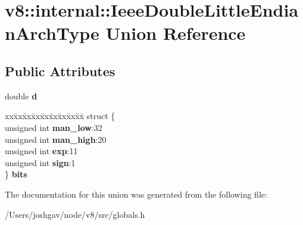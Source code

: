 \hypertarget{unionv8_1_1internal_1_1_ieee_double_little_endian_arch_type}{}\section{v8\+:\+:internal\+:\+:Ieee\+Double\+Little\+Endian\+Arch\+Type Union Reference}
\label{unionv8_1_1internal_1_1_ieee_double_little_endian_arch_type}
\subsection*{Public Attributes}
\begin{DoxyCompactItemize}
\item 
double {\bfseries d}\hypertarget{unionv8_1_1internal_1_1_ieee_double_little_endian_arch_type_aae1ea6412f669875160955735ed06f43}{}\label{unionv8_1_1internal_1_1_ieee_double_little_endian_arch_type_aae1ea6412f669875160955735ed06f43}

\item 
\begin{tabbing}
xx\=xx\=xx\=xx\=xx\=xx\=xx\=xx\=xx\=\kill
struct \{\\
\>unsigned int {\bfseries man\_low}:32\\
\>unsigned int {\bfseries man\_high}:20\\
\>unsigned int {\bfseries exp}:11\\
\>unsigned int {\bfseries sign}:1\\
\} {\bfseries bits}\hypertarget{unionv8_1_1internal_1_1_ieee_double_little_endian_arch_type_a1337248a9a7575dde85da49dfefcbb49}{}\label{unionv8_1_1internal_1_1_ieee_double_little_endian_arch_type_a1337248a9a7575dde85da49dfefcbb49}
\\

\end{tabbing}\end{DoxyCompactItemize}


The documentation for this union was generated from the following file\+:\begin{DoxyCompactItemize}
\item 
/\+Users/joshgav/node/v8/src/globals.\+h\end{DoxyCompactItemize}
